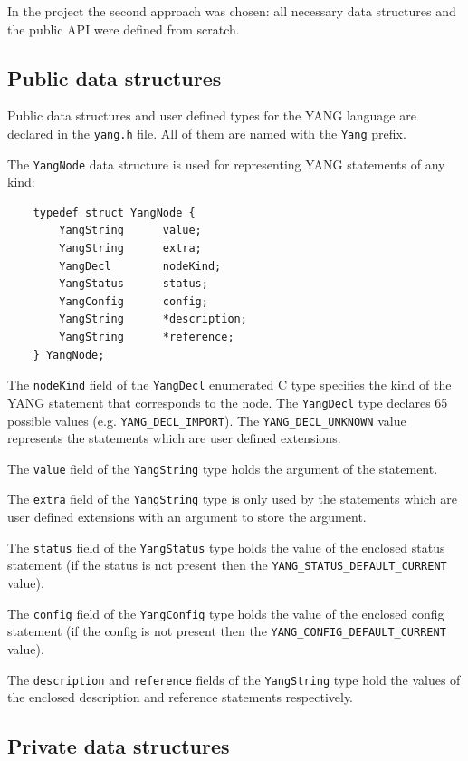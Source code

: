 \documentclass[conference]{IEEEtran}
\begin{document}
In the project the second approach was chosen: all necessary data structures and the public API were defined from scratch.

\subsection{Public data structures}
Public data structures and user defined types for the YANG language are declared in the \texttt{yang.h} file. All of them are named with the \texttt{Yang} prefix. 

The \texttt{YangNode} data structure is used for representing YANG statements of any kind:
\small
\begin{center}
\begin{verbatim}
    typedef struct YangNode {
        YangString      value;
        YangString      extra;
        YangDecl        nodeKind;
        YangStatus      status;
        YangConfig      config;
        YangString      *description;
        YangString      *reference;
    } YangNode;
\end{verbatim}
\end{center}
\normalsize
The \texttt{nodeKind} field of the \texttt{YangDecl} enumerated C type specifies the kind of the YANG statement that corresponds to the node. The \texttt{YangDecl} type declares 65 possible values (e.g. \texttt{YANG\_DECL\_IMPORT}). The \texttt{YANG\_DECL\_UNKNOWN} value represents the statements which are user defined extensions.

The \texttt{value} field of the \texttt{YangString} type holds the argument of the statement.

The \texttt{extra} field of the \texttt{YangString} type is only used by the statements which are user defined extensions with an argument to store the argument.

The \texttt{status} field of the \texttt{YangStatus} type holds the value of the enclosed status statement (if the status is not present then the \texttt{YANG\_STATUS\_DEFAULT\_CURRENT} value).

The \texttt{config} field of the \texttt{YangConfig} type holds the value of the enclosed config statement (if the config is not present then the \texttt{YANG\_CONFIG\_DEFAULT\_CURRENT} value).

The \texttt{description} and \texttt{reference} fields of the \texttt{YangString} type hold the values of the enclosed description and reference statements respectively.

\subsection{Private data structures}
\end{document}
